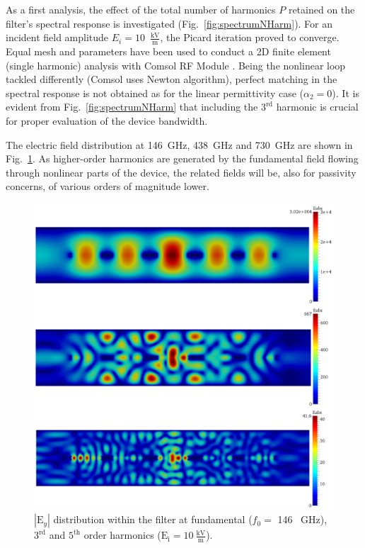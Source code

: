 As a first analysis, the effect of the total number of harmonics $P$
retained on the filter's spectral response is investigated
(Fig.~\ref{fig:spectrumNHarm}). For an incident field amplitude $E_i = 10$~${\frac{\mathrm{kV}}{\mathrm{m}}}$, the Picard iteration proved to converge. Equal mesh and parameters have been used to conduct a \mbox{2D} finite element (single harmonic) analysis with Comsol RF Module \cite{ComsolRF}. Being the nonlinear loop tackled differently (Comsol uses Newton algorithm), perfect matching in the spectral response is not obtained as for the linear permittivity case ($\alpha_2 = 0$).
It is evident from Fig.~\ref{fig:spectrumNHarm} that including 
the $3^\mathrm{rd}$ harmonic is crucial for proper evaluation of the device
bandwidth.

The electric field distribution at 146~GHz, 438~GHz and 730~GHz are shown in Fig.~\ref{fig:Fields}. As higher-order harmonics are generated by the fundamental field flowing through nonlinear parts of the device, the related fields will be, also for passivity concerns, of various orders of magnitude lower.

\begin{figure}[!ht]
\centering
\includegraphics[width=14.4cm]{FieldsCol}
\caption{$|\mathrm{E}_y|$ distribution within the filter at fundamental 
($f_0 =$ 146 ~GHz), $3^\mathrm{rd}$ and $5^\mathrm{th}$ order harmonics 
($\mathrm{E_i = 10 ~{\frac{\mathrm{kV}}{\mathrm{m}}}}$).}
\label{fig:Fields}
\end{figure}

